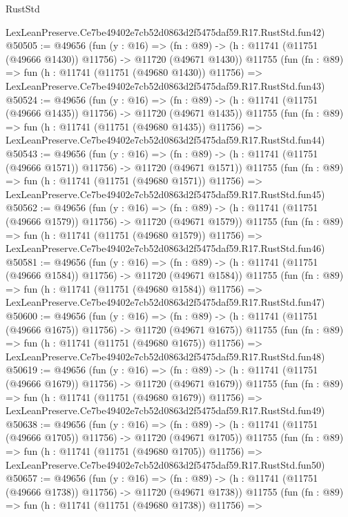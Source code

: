 \begin{lexlean}{RustStd}
\begin{coremodule}
    LexLeanPreserve.Ce7be49402e7cb52d0863d2f5475daf59.R17.RustStd.fun42)
@50505 := @49656
    (fun (y : @16) =>
    (fn : @89) -> (h : @11741 (@11751 (@49666 @1430)) @11756) -> @11720 (@49671 @1430))
    @11755
    (fun (fn : @89) =>
    fun (h : @11741 (@11751 (@49680 @1430)) @11756) =>
    LexLeanPreserve.Ce7be49402e7cb52d0863d2f5475daf59.R17.RustStd.fun43)
@50524 := @49656
    (fun (y : @16) =>
    (fn : @89) -> (h : @11741 (@11751 (@49666 @1435)) @11756) -> @11720 (@49671 @1435))
    @11755
    (fun (fn : @89) =>
    fun (h : @11741 (@11751 (@49680 @1435)) @11756) =>
    LexLeanPreserve.Ce7be49402e7cb52d0863d2f5475daf59.R17.RustStd.fun44)
@50543 := @49656
    (fun (y : @16) =>
    (fn : @89) -> (h : @11741 (@11751 (@49666 @1571)) @11756) -> @11720 (@49671 @1571))
    @11755
    (fun (fn : @89) =>
    fun (h : @11741 (@11751 (@49680 @1571)) @11756) =>
    LexLeanPreserve.Ce7be49402e7cb52d0863d2f5475daf59.R17.RustStd.fun45)
@50562 := @49656
    (fun (y : @16) =>
    (fn : @89) -> (h : @11741 (@11751 (@49666 @1579)) @11756) -> @11720 (@49671 @1579))
    @11755
    (fun (fn : @89) =>
    fun (h : @11741 (@11751 (@49680 @1579)) @11756) =>
    LexLeanPreserve.Ce7be49402e7cb52d0863d2f5475daf59.R17.RustStd.fun46)
@50581 := @49656
    (fun (y : @16) =>
    (fn : @89) -> (h : @11741 (@11751 (@49666 @1584)) @11756) -> @11720 (@49671 @1584))
    @11755
    (fun (fn : @89) =>
    fun (h : @11741 (@11751 (@49680 @1584)) @11756) =>
    LexLeanPreserve.Ce7be49402e7cb52d0863d2f5475daf59.R17.RustStd.fun47)
@50600 := @49656
    (fun (y : @16) =>
    (fn : @89) -> (h : @11741 (@11751 (@49666 @1675)) @11756) -> @11720 (@49671 @1675))
    @11755
    (fun (fn : @89) =>
    fun (h : @11741 (@11751 (@49680 @1675)) @11756) =>
    LexLeanPreserve.Ce7be49402e7cb52d0863d2f5475daf59.R17.RustStd.fun48)
@50619 := @49656
    (fun (y : @16) =>
    (fn : @89) -> (h : @11741 (@11751 (@49666 @1679)) @11756) -> @11720 (@49671 @1679))
    @11755
    (fun (fn : @89) =>
    fun (h : @11741 (@11751 (@49680 @1679)) @11756) =>
    LexLeanPreserve.Ce7be49402e7cb52d0863d2f5475daf59.R17.RustStd.fun49)
@50638 := @49656
    (fun (y : @16) =>
    (fn : @89) -> (h : @11741 (@11751 (@49666 @1705)) @11756) -> @11720 (@49671 @1705))
    @11755
    (fun (fn : @89) =>
    fun (h : @11741 (@11751 (@49680 @1705)) @11756) =>
    LexLeanPreserve.Ce7be49402e7cb52d0863d2f5475daf59.R17.RustStd.fun50)
@50657 := @49656
    (fun (y : @16) =>
    (fn : @89) -> (h : @11741 (@11751 (@49666 @1738)) @11756) -> @11720 (@49671 @1738))
    @11755
    (fun (fn : @89) =>
    fun (h : @11741 (@11751 (@49680 @1738)) @11756) =>

\end{coremodule}
\end{lexlean}
